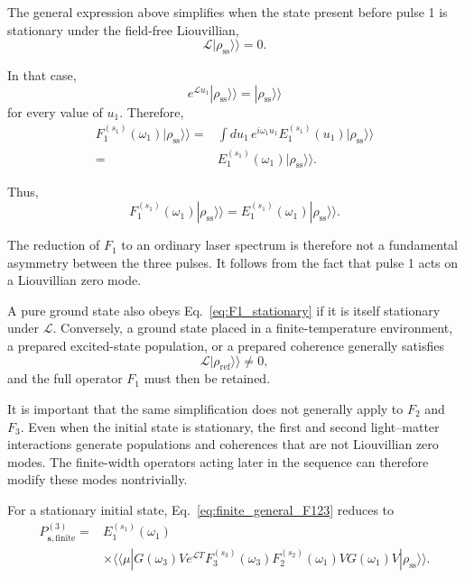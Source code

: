 \documentclass[11pt]{article}
\begin{document}
The general expression above simplifies when the state present before
pulse 1 is stationary under the field-free Liouvillian,
%
\begin{equation}
\boxed{
\mathcal{L}
|\rho_{\mathrm{ss}}\rangle\rangle
=
0.
}
\label{eq:stationary_state_condition}
\end{equation}

In that case,
%
\begin{equation}
e^{\mathcal{L}u_1}
|\rho_{\mathrm{ss}}\rangle\rangle
=
|\rho_{\mathrm{ss}}\rangle\rangle
\end{equation}
%
for every value of $u_1$. Therefore,
%
\begin{align}
F_1^{(s_1)}(\omega_1)
|\rho_{\mathrm{ss}}\rangle\rangle
={}&
\int du_1\,
e^{i\omega_1u_1}
E_1^{(s_1)}(u_1)
|\rho_{\mathrm{ss}}\rangle\rangle
\\
={}&
E_1^{(s_1)}(\omega_1)
|\rho_{\mathrm{ss}}\rangle\rangle .
\end{align}

Thus,
%
\begin{equation}
\boxed{
F_1^{(s_1)}(\omega_1)
|\rho_{\mathrm{ss}}\rangle\rangle
=
E_1^{(s_1)}(\omega_1)
|\rho_{\mathrm{ss}}\rangle\rangle .
}
\label{eq:F1_stationary}
\end{equation}

The reduction of $F_1$ to an ordinary laser spectrum is therefore not
a fundamental asymmetry between the three pulses. It follows from the
fact that pulse 1 acts on a Liouvillian zero mode.

A pure ground state also obeys
Eq.~\eqref{eq:F1_stationary} if it is itself stationary under
$\mathcal{L}$. Conversely, a ground state placed in a finite-temperature
environment, a prepared excited-state population, or a prepared
coherence generally satisfies
%
\begin{equation}
\mathcal{L}|\rho_{\mathrm{ref}}\rangle\rangle
\neq0,
\end{equation}
%
and the full operator $F_1$ must then be retained.

It is important that the same simplification does not generally apply
to $F_2$ and $F_3$. Even when the initial state is stationary, the
first and second light--matter interactions generate populations and
coherences that are not Liouvillian zero modes. The finite-width
operators acting later in the sequence can therefore modify these
modes nontrivially.

For a stationary initial state,
Eq.~\eqref{eq:finite_general_F123} reduces to
%
\begin{equation}
\boxed{
\begin{aligned}
P_{\mathbf{s},\mathrm{finite}}^{(3)}
={}&
E_1^{(s_1)}(\omega_1)
\\
&\times
\langle\!\langle\mu|
G(\omega_3)
V
e^{\mathcal{L}T}
F_3^{(s_3)}(\omega_3)
F_2^{(s_2)}(\omega_1)
V
G(\omega_1)
V
|\rho_{\mathrm{ss}}\rangle\rangle .
\end{aligned}
}
\label{eq:finite_stationary}
\end{equation}
\end{document}
